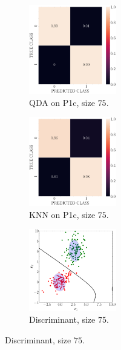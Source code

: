 \documentclass[11pt, a4 paper]{article}
\begin{document}
\begin{figure}[!htbp]
\quad    
    \begin{subfigure}[!htbp]{0.24\textwidth}
       \centering
       \includegraphics[width=1.5in]{../results/ex1/conf_mtx_QD_ML_dataset_P1c_size_75.pdf}
       \caption{QDA on P1c, size $75$.}
       \label{fig:KNN_P1c_75}
    \end{subfigure}
\quad    
    \begin{subfigure}[!htbp]{0.24\textwidth}
       \centering
       \includegraphics[width=1.5in]{../results/ex1/conf_mtx_KNN_dataset_P1c_size_75.pdf}
       \caption{KNN on P1c, size $75$.}
       \label{fig:KNN_P1c_75}
    \end{subfigure}
\quad
    \begin{subfigure}[!htbp]{0.24\textwidth}
       \centering
       \includegraphics[width=1.5in]{../results/ex1/samples_QD_ML_dataset_P1c_size_75.pdf}
       \caption{Discriminant, size $75$.}
       \label{fig:KNN_P1c_75}
    \end{subfigure}
    

\end{figure}
\end{document}
